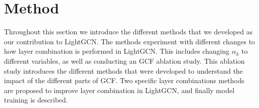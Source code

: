 \section{Method}
Throughout this section we introduce the different methods that we developed as our contribution to LightGCN.
The methods experiment with different changes to how layer combination is performed in LightGCN.
This includes changing $\alpha_k$ to different variables, as well as conducting an GCF ablation study. 
This ablation study introduces the different methods that were developed to understand the impact of the different parts of GCF.
Two specific layer combinations methods are proposed to improve layer combination in LightGCN, and finally model training is described.



